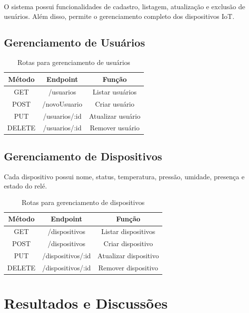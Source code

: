 \documentclass[12pt]{unisenaiclass}
\begin{document}
O sistema possui funcionalidades de cadastro, listagem, atualização e exclusão de usuários. Além disso, permite o gerenciamento completo dos dispositivos IoT.

\subsection{Gerenciamento de Usuários}

\begin{table}[H]
    \centering
    \caption{Rotas para gerenciamento de usuários}
    \begin{tabular}{|c|c|c|}
        \hline
        Método & Endpoint & Função \\ \hline
        GET & /usuarios & Listar usuários \\ \hline
        POST & /novoUsuario & Criar usuário \\ \hline
        PUT & /usuarios/:id & Atualizar usuário \\ \hline
        DELETE & /usuarios/:id & Remover usuário \\ \hline
    \end{tabular}
\end{table}

\subsection{Gerenciamento de Dispositivos}

Cada dispositivo possui nome, status, temperatura, pressão, umidade, presença e estado do relé.

\begin{table}[H]
    \centering
    \caption{Rotas para gerenciamento de dispositivos}
    \begin{tabular}{|c|c|c|}
        \hline
        Método & Endpoint & Função \\ \hline
        GET & /dispositivos & Listar dispositivos \\ \hline
        POST & /dispositivos & Criar dispositivo \\ \hline
        PUT & /dispositivos/:id & Atualizar dispositivo \\ \hline
        DELETE & /dispositivos/:id & Remover dispositivo \\ \hline
    \end{tabular}
\end{table}

\section{Resultados e Discussões}
\end{document}

